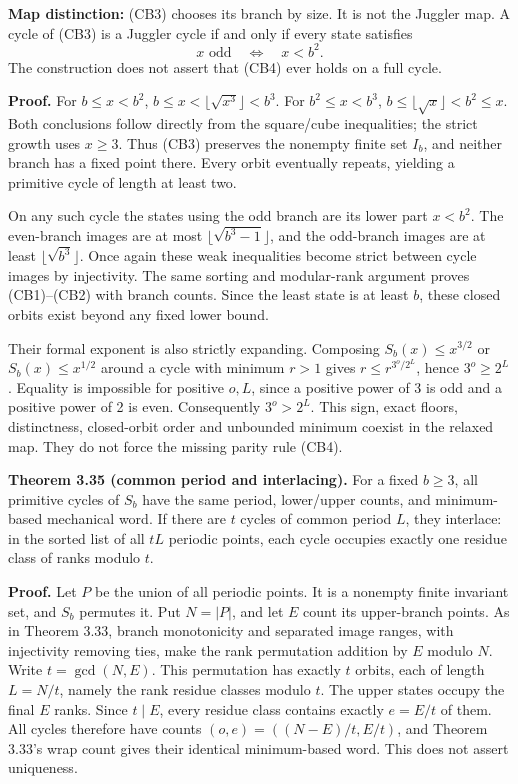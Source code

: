 \documentclass[12pt]{article}
\begin{document}
\textbf{Map distinction:} (CB3) chooses its branch by size. It is not
the Juggler map. A cycle of (CB3) is a Juggler cycle if and only if
every state satisfies \[
x\text{ odd}\quad\Longleftrightarrow\quad x<b^2.\tag{CB4}
\] The construction does not assert that (CB4) ever holds on a full
cycle.

\textbf{Proof.} For \(b\le x<b^2\),
\(b\le x<\lfloor\sqrt{x^3}\rfloor<b^3\). For \(b^2\le x<b^3\),
\(b\le\lfloor\sqrt x\rfloor<b^2\le x\). Both conclusions follow directly
from the square/cube inequalities; the strict growth uses \(x\ge3\).
Thus (CB3) preserves the nonempty finite set \(I_b\), and neither branch
has a fixed point there. Every orbit eventually repeats, yielding a
primitive cycle of length at least two.

On any such cycle the states using the odd branch are its lower part
\(x<b^2\). The even-branch images are at most
\(\lfloor\sqrt{b^3-1}\rfloor\), and the odd-branch images are at least
\(\lfloor\sqrt{b^3}\rfloor\). Once again these weak inequalities become
strict between cycle images by injectivity. The same sorting and
modular-rank argument proves (CB1)--(CB2) with branch counts. Since the
least state is at least \(b\), these closed orbits exist beyond any
fixed lower bound.

Their formal exponent is also strictly expanding. Composing
\(S_b(x)\le x^{3/2}\) or \(S_b(x)\le x^{1/2}\) around a cycle with
minimum \(r>1\) gives \(r\le r^{3^o/2^L}\), hence \(3^o\ge2^L\).
Equality is impossible for positive \(o,L\), since a positive power of 3
is odd and a positive power of 2 is even. Consequently \(3^o>2^L\). This
sign, exact floors, distinctness, closed-orbit order and unbounded
minimum coexist in the relaxed map. They do not force the missing parity
rule (CB4).

\textbf{Theorem 3.35 (common period and interlacing).} For a fixed
\(b\ge3\), all primitive cycles of \(S_b\) have the same period,
lower/upper counts, and minimum-based mechanical word. If there are
\(t\) cycles of common period \(L\), they interlace: in the sorted list
of all \(tL\) periodic points, each cycle occupies exactly one residue
class of ranks modulo \(t\).

\textbf{Proof.} Let \(P\) be the union of all periodic points. It is a
nonempty finite invariant set, and \(S_b\) permutes it. Put \(N=|P|\),
and let \(E\) count its upper-branch points. As in Theorem 3.33, branch
monotonicity and separated image ranges, with injectivity removing ties,
make the rank permutation addition by \(E\) modulo \(N\). Write
\(t=\gcd(N,E)\). This permutation has exactly \(t\) orbits, each of
length \(L=N/t\), namely the rank residue classes modulo \(t\). The
upper states occupy the final \(E\) ranks. Since \(t\mid E\), every
residue class contains exactly \(e=E/t\) of them. All cycles therefore
have counts \((o,e)=((N-E)/t,E/t)\), and Theorem 3.33's wrap count gives
their identical minimum-based word. This does not assert uniqueness.
\end{document}
